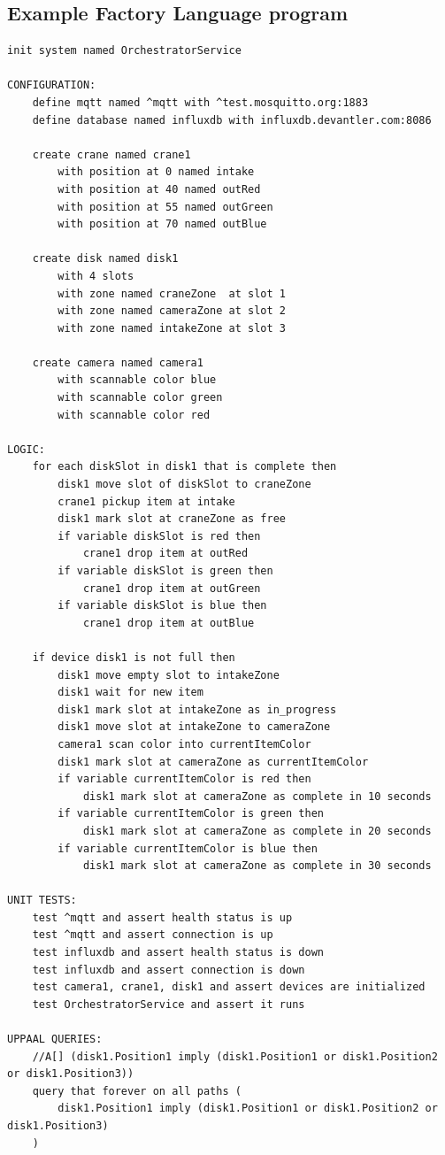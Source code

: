 \subsection{Example Factory Language program}\label{appendix:fl-updated}
\begin{verbatim}
init system named OrchestratorService

CONFIGURATION:
	define mqtt named ^mqtt with ^test.mosquitto.org:1883
	define database named influxdb with influxdb.devantler.com:8086
	
	create crane named crane1
		with position at 0 named intake 
		with position at 40 named outRed 
		with position at 55 named outGreen 
		with position at 70 named outBlue  
	
	create disk named disk1
		with 4 slots
		with zone named craneZone  at slot 1 
		with zone named cameraZone at slot 2
		with zone named intakeZone at slot 3 
	
	create camera named camera1
		with scannable color blue 
		with scannable color green 
		with scannable color red

LOGIC:
	for each diskSlot in disk1 that is complete then
		disk1 move slot of diskSlot to craneZone
		crane1 pickup item at intake
		disk1 mark slot at craneZone as free
		if variable diskSlot is red then  
			crane1 drop item at outRed
		if variable diskSlot is green then  
			crane1 drop item at outGreen
		if variable diskSlot is blue then  
			crane1 drop item at outBlue
	
	if device disk1 is not full then  
		disk1 move empty slot to intakeZone
		disk1 wait for new item
		disk1 mark slot at intakeZone as in_progress 
		disk1 move slot at intakeZone to cameraZone
		camera1 scan color into currentItemColor 
		disk1 mark slot at cameraZone as currentItemColor  
		if variable currentItemColor is red then  
			disk1 mark slot at cameraZone as complete in 10 seconds  
		if variable currentItemColor is green then  
			disk1 mark slot at cameraZone as complete in 20 seconds  
		if variable currentItemColor is blue then  
			disk1 mark slot at cameraZone as complete in 30 seconds

UNIT TESTS:
	test ^mqtt and assert health status is up
	test ^mqtt and assert connection is up
	test influxdb and assert health status is down
	test influxdb and assert connection is down
	test camera1, crane1, disk1 and assert devices are initialized
	test OrchestratorService and assert it runs
	
UPPAAL QUERIES:
	//A[] (disk1.Position1 imply (disk1.Position1 or disk1.Position2 or disk1.Position3))
	query that forever on all paths (
		disk1.Position1 imply (disk1.Position1 or disk1.Position2 or disk1.Position3)
	)
	

\end{verbatim}
